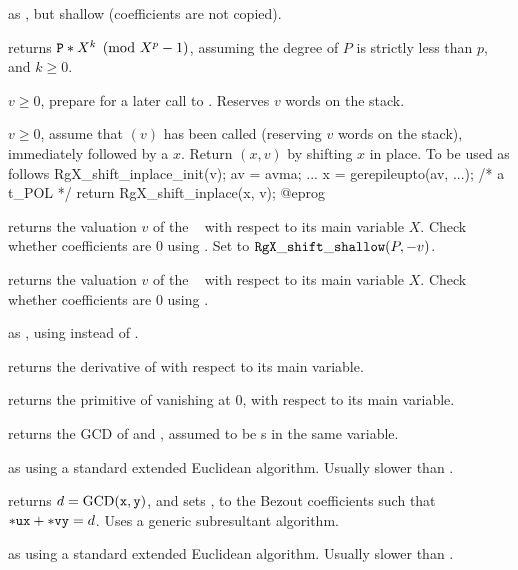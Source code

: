  as , but
shallow (coefficients are not copied).

 returns ${\tt P} * X^k
\pmod {X^p-1}$, assuming the degree of $P$ is strictly less than $p$, and
$k\geq 0$.

 $v \geq 0$, prepare for a later
call to . Reserves $v$ words on the stack.

 $v \geq 0$, assume that
$(v)$ has been called (reserving $v$ words on the
stack), immediately followed by a  $x$. Return $(x,v)$
by shifting $x$ in place. To be used as follows
\bprog
  RgX_shift_inplace_init(v);
  av = avma;
  ...
  x = gerepileupto(av, ...); /* a t_POL */
  return RgX_shift_inplace(x, v);
@eprog

 returns the valuation $v$ of the
~ with respect to its main variable $X$. Check whether
coefficients are $0$ using . Set  to
${\tt RgX\_shift\_shallow}(P,-v)$.

 returns the valuation $v$ of the
~ with respect to its main variable $X$. Check whether
coefficients are $0$ using .

 as , using
 instead of .

 returns the derivative of  with respect to
its main variable.

 returns the primitive of  vanishing at
$0$, with respect to its main variable.

 returns the GCD of  and ,
assumed to be s in the same variable.

 as  using a standard
extended Euclidean algorithm. Usually slower than .

 returns
$d = {\rm GCD}({\tt x},{\tt y})$, and sets ,  to the Bezout
coefficients such that ${\tt *ux} + {\tt *vy} = d$. Uses a generic
subresultant algorithm.

 as
 using a standard extended Euclidean algorithm. Usually
slower than .

